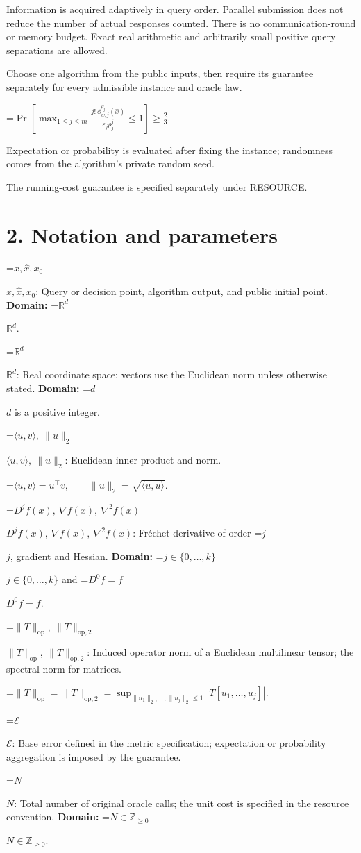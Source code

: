 \documentclass[10pt,a4paper]{article}
\newcommand{\AtlasMath}[1]{\par\begingroup\centering\setbox0=\hbox{$\displaystyle #1$}\ifdim\wd0>1.4\linewidth\typeout{ATLAS WIDE FORMULA: \the\wd0}\fi\ifdim\wd0>\linewidth\resizebox{\linewidth}{!}{\box0}\else\box0\fi\par\endgroup}
\newcommand{\AtlasInlineMath}[1]{\begingroup\setbox0=\hbox{$#1$}\ifdim\wd0>.4\linewidth\endgroup\AtlasMath{#1}\else\endgroup$#1$\fi}
\begin{document}
Information is acquired adaptively in query order. Parallel submission does not reduce the number of actual responses counted. There is no communication-round or memory budget. Exact real arithmetic and arbitrarily small positive query separations are allowed.

Choose one algorithm from the public inputs, then require its guarantee separately for every admissible instance and oracle law.


\AtlasMath{\Pr\!\left[\max_{1\le j\le m}\frac{j!\,\phi_{w,j}^{\rho_j}(\widehat{x})}{\varepsilon_j\rho_j^j}\le 1\right]\ge\frac23.}


Expectation or probability is evaluated after fixing the instance; randomness comes from the algorithm's private random seed.

The running-cost guarantee is specified separately under RESOURCE.

\section{2. Notation and parameters}
\AtlasInlineMath{x,\widehat{x},x_0}: Query or decision point, algorithm output, and public initial point. \textbf{Domain:} \AtlasInlineMath{\mathbb{R}^d}.

\AtlasInlineMath{\mathbb{R}^d}: Real coordinate space; vectors use the Euclidean norm unless otherwise stated. \textbf{Domain:} \AtlasInlineMath{d} is a positive integer.

\AtlasInlineMath{\langle u,v\rangle,\ \|u\|_2}: Euclidean inner product and norm.


\AtlasMath{\langle u,v\rangle=u^\top v,\qquad\|u\|_2=\sqrt{\langle u,u\rangle}.}


\AtlasInlineMath{D^jf(x),\ \nabla f(x),\ \nabla^2f(x)}: Fréchet derivative of order \AtlasInlineMath{j}, gradient and Hessian. \textbf{Domain:} \AtlasInlineMath{j\in\{0,\ldots,k\}} and \AtlasInlineMath{D^0f=f}.

\AtlasInlineMath{\|T\|_{\mathrm{op}},\ \|T\|_{\mathrm{op},2}}: Induced operator norm of a Euclidean multilinear tensor; the spectral norm for matrices.


\AtlasMath{\|T\|_{\mathrm{op}}=\|T\|_{\mathrm{op},2}=\sup_{\|u_1\|_2,\ldots,\|u_j\|_2\le1}|T[u_1,\ldots,u_j]|.}


\AtlasInlineMath{\mathcal{E}}: Base error defined in the metric specification; expectation or probability aggregation is imposed by the guarantee.

\AtlasInlineMath{N}: Total number of original oracle calls; the unit cost is specified in the resource convention. \textbf{Domain:} \AtlasInlineMath{N\in\mathbb{Z}_{\ge0}}.
\end{document}

